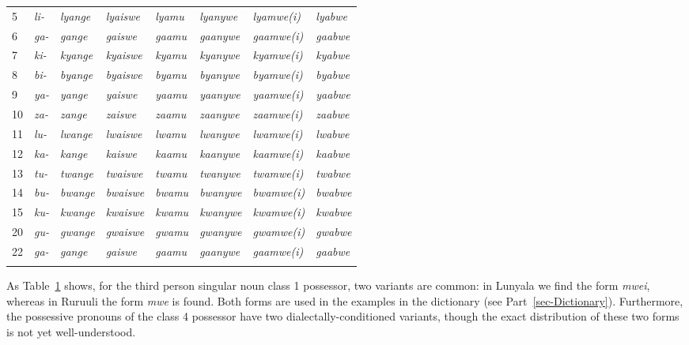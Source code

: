 \begin{table}
{\begin{tabular}{l l l l l l l l}
5 & \textit{li-}& \textit{lyange} & \textit{lyaiswe} & \textit{lyamu} & \textit{lyanywe} & \textit{lyamwe(i)} & \textit{lyabwe}\\
6 & \textit{ga-}& \textit{gange} & \textit{gaiswe} & \textit{gaamu} & \textit{gaanywe} & \textit{gaamwe(i)} & \textit{gaabwe}\\
7 & \textit{ki-}& \textit{kyange} & \textit{kyaiswe} & \textit{kyamu} & \textit{kyanywe} & \textit{kyamwe(i)} & \textit{kyabwe}\\
8 & \textit{bi-}& \textit{byange} & \textit{byaiswe} & \textit{byamu} & \textit{byanywe} & \textit{byamwe(i)} & \textit{byabwe}\\
9 & \textit{ya-}& \textit{yange} & \textit{yaiswe} & \textit{yaamu} & \textit{yaanywe} & \textit{yaamwe(i)} & \textit{yaabwe}\\
10 & \textit{za-}& \textit{zange} & \textit{zaiswe} & \textit{zaamu} & \textit{zaanywe} & \textit{zaamwe(i)} & \textit{zaabwe}\\
11 & \textit{lu-}& \textit{lwange} & \textit{lwaiswe} & \textit{lwamu} & \textit{lwanywe} & \textit{lwamwe(i)} & \textit{lwabwe}\\
12 & \textit{ka-}& \textit{kange} & \textit{kaiswe} & \textit{kaamu} & \textit{kaanywe} & \textit{kaamwe(i)} & \textit{kaabwe}\\
13 & \textit{tu-}& \textit{twange} & \textit{twaiswe} & \textit{twamu} & \textit{twanywe} & \textit{twamwe(i)} & \textit{twabwe}\\
14& \textit{bu-} & \textit{bwange} & \textit{bwaiswe} & \textit{bwamu} & \textit{bwanywe} & \textit{bwamwe(i)} & \textit{bwabwe}\\
15 & \textit{ku-}& \textit{kwange} & \textit{kwaiswe} & \textit{kwamu} & \textit{kwanywe} & \textit{kwamwe(i)} & \textit{kwabwe}\\
20 & \textit{gu-}& \textit{gwange} & \textit{gwaiswe} & \textit{gwamu} & \textit{gwanywe} & \textit{gwamwe(i)} & \textit{gwabwe}\\
22 & \textit{ga-}& \textit{gange} & \textit{gaiswe} & \textit{gaamu} & \textit{gaanywe} & \textit{gaamwe(i)} & \textit{gaabwe}\\
\lspbottomrule
\end{tabular}
}
\label{tab-proposs}
\end{table}

As Table~\ref{tab-proposs}  shows, for the third person singular noun class 1 possessor, two variants are common: in Lunyala we find the form \textit{mwei}, whereas in Ruruuli the form \textit{mwe} is found. 
Both forms are used in the examples in the dictionary (see Part~\ref{sec-Dictionary}).
Furthermore, the possessive pronouns of the class 4 possessor have two dialectally-conditioned variants, though the exact distribution of these two forms is not yet well-understood.

